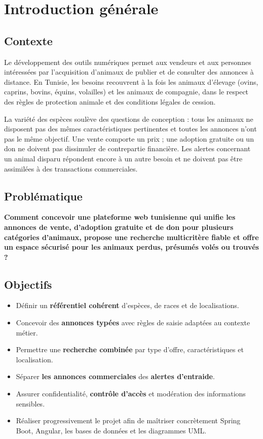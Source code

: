 \chapter{Introduction générale}
\section{Contexte}
Le développement des outils numériques permet aux vendeurs et aux personnes intéressées par l’acquisition d’animaux de publier et de consulter des annonces à distance. En Tunisie, les besoins recouvrent à la fois les animaux d’élevage (ovins, caprins, bovins, équins, volailles) et les animaux de compagnie, dans le respect des règles de protection animale et des conditions légales de cession.

La variété des espèces soulève des questions de conception : tous les animaux ne disposent pas des mêmes caractéristiques pertinentes et toutes les annonces n’ont pas le même objectif. Une vente comporte un prix ; une adoption gratuite ou un don ne doivent pas dissimuler de contrepartie financière. Les alertes concernant un animal disparu répondent encore à un autre besoin et ne doivent pas être assimilées à des transactions commerciales.

\section{Problématique}
\begin{notebox}
\textbf{Comment concevoir une plateforme web tunisienne qui unifie les annonces de vente, d’adoption gratuite et de don pour plusieurs catégories d’animaux, propose une recherche multicritère fiable et offre un espace sécurisé pour les animaux perdus, présumés volés ou trouvés ?}
\end{notebox}

\section{Objectifs}
\begin{itemize}
 \item Définir un \textbf{référentiel cohérent} d’espèces, de races et de localisations.
 \item Concevoir des \textbf{annonces typées} avec règles de saisie adaptées au contexte métier.
 \item Permettre une \textbf{recherche combinée} par type d’offre, caractéristiques et localisation.
 \item Séparer \textbf{les annonces commerciales} des \textbf{alertes d’entraide}.
 \item Assurer confidentialité, \textbf{contrôle d’accès} et modération des informations sensibles.
 \item Réaliser progressivement le projet afin de maîtriser concrètement Spring Boot, Angular, les bases de données et les diagrammes UML.
\end{itemize}

